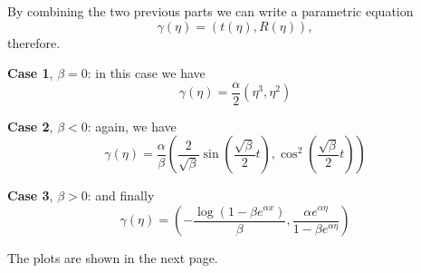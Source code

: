 \documentclass[11pt]{article}
\begin{document}
\begin{solution}
By combining the two previous parts we can write a parametric equation
\begin{displaymath}
  \gamma(\eta) = (t(\eta),R(\eta)),
\end{displaymath}
therefore.

\textbf{Case 1}, $\beta=0$: in this case we have
\begin{displaymath}
  \gamma(\eta) = \frac{\alpha}{2}\left(\eta^3,\eta^2 \right)
\end{displaymath}


\textbf{Case 2}, $\beta<0$: again, we have
\begin{displaymath}
  \gamma(\eta) = \frac{\alpha}{\beta}\left( \frac{2}{\sqrt{\beta}}\sin\left(\frac{\sqrt{\beta}}{2}t \right),\cos^2\left( \frac{\sqrt{\beta}}{2}t\right) \right)
\end{displaymath}

\textbf{Case 3}, $\beta>0$: and finally
\begin{displaymath}
  \gamma(\eta) = \left(-\frac{\log \left(1-\beta  e^{\alpha  x}\right)}{\beta }, \frac{\alpha e^{\alpha\eta}}{1-\beta e^{\alpha\eta}}\right)
\end{displaymath}
\end{solution}
The plots are shown in the next page.

\end{document}

